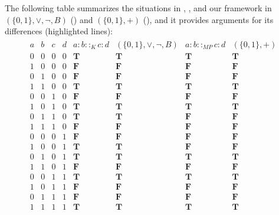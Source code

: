 \documentclass[11pt]{amsart}
\theoremstyle{definition} %
\begin{document}
The following table summarizes the situations in , , and our framework in $(\{0,1\},\lor,\neg,B)$ () and $(\{0,1\},+)$ (), and it provides arguments for its differences (highlighted lines):
\begin{align*}
\begin{array}{cccc||c|c||c|c}
	a & b & c & d & a:b::_Kc:d & (\{0,1\},\lor,\neg,B) & a:b::_{MP}c:d & (\{0,1\},+)\\
	\hline
	0 & 0 & 0 & 0 & \mathbf T & \mathbf T & \mathbf T & \mathbf T \\
	1 & 0 & 0 & 0 & \mathbf F & \mathbf F & \mathbf F & \mathbf F \\
	0 & 1 & 0 & 0 & \mathbf F & \mathbf F & \mathbf F & \mathbf F \\
	1 & 1 & 0 & 0 & \mathbf T & \mathbf T & \mathbf T & \mathbf T \\
	0 & 0 & 1 & 0 & \mathbf F & \mathbf F & \mathbf F & \mathbf F \\
	1 & 0 & 1 & 0 & \mathbf T & \mathbf T & \mathbf T & \mathbf T \\
	\hline
	0 & 1 & 1 & 0 & \mathbf T & \mathbf T & \mathbf F & \mathbf F \\
	\hline
	1 & 1 & 1 & 0 & \mathbf F & \mathbf F & \mathbf F & \mathbf F \\
	0 & 0 & 0 & 1 & \mathbf F & \mathbf F & \mathbf F & \mathbf F \\
	\hline
	1 & 0 & 0 & 1 & \mathbf T & \mathbf T & \mathbf F & \mathbf F \\
	\hline
	0 & 1 & 0 & 1 & \mathbf T & \mathbf T & \mathbf T & \mathbf T \\
	1 & 1 & 0 & 1 & \mathbf F & \mathbf F & \mathbf F & \mathbf F \\
	0 & 0 & 1 & 1 & \mathbf T & \mathbf T & \mathbf T & \mathbf T \\
	1 & 0 & 1 & 1 & \mathbf F & \mathbf F & \mathbf F & \mathbf F \\
	0 & 1 & 1 & 1 & \mathbf F & \mathbf F & \mathbf F & \mathbf F \\
	1 & 1 & 1 & 1 & \mathbf T & \mathbf T & \mathbf T & \mathbf T
\end{array}
\end{align*}
\end{document}
